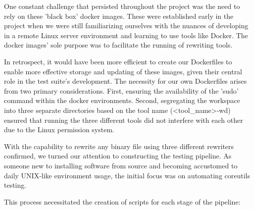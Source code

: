 \documentclass[a4paper,11pt,oneside]{report}
\begin{document}
One constant challenge that persisted throughout the project was the need to rely
on these 'black box' docker images. These were established early in the project when we
were still familiarizing ourselves with the nuances of developing in a remote Linux server
environment and learning to use tools like Docker. The docker images' sole purpose was to
facilitate the running of rewriting tools.

In retrospect, it would have been more efficient to create our Dockerfiles to enable
more effective storage and updating of these images, given their central role in the test
suite's development. The necessity for our own Dockerfiles arises from two primary
considerations. First, ensuring the availability of the 'sudo' command within the docker
environments. Second, segregating the workspace into three separate directories based on
the tool name (\textless{}tool\_name\textgreater{}-wd) ensured that running the three different tools did not
interfere with each other due to the Linux permission system.

With the capability to rewrite any binary file using three different rewriters
confirmed, we turned our attention to constructing the testing pipeline. As someone new to
installing software from source and becoming accustomed to daily UNIX-like environment
usage, the initial focus was on automating coreutils testing.

This process necessitated the creation of scripts for each stage of the pipeline:
\end{document}
